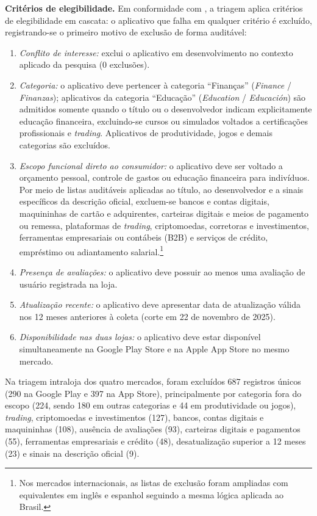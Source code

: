 \textbf{Critérios de elegibilidade.} Em conformidade com \textcite{alsebayel2025}, a triagem aplica critérios de elegibilidade em cascata: o aplicativo que falha em qualquer critério é excluído, registrando-se o primeiro motivo de exclusão de forma auditável:
\begin{enumerate}
    \item[(1)] \textit{Conflito de interesse:} exclui o aplicativo em desenvolvimento no contexto aplicado da pesquisa (0 exclusões).
    \item[(2)] \textit{Categoria:} o aplicativo deve pertencer à categoria ``Finanças'' (\textit{Finance} / \textit{Finanzas}); aplicativos da categoria ``Educação'' (\textit{Education} / \textit{Educación}) são admitidos somente quando o título ou o desenvolvedor indicam explicitamente educação financeira, excluindo-se cursos ou simulados voltados a certificações profissionais e \textit{trading}. Aplicativos de produtividade, jogos e demais categorias são excluídos.
    \item[(3)] \textit{Escopo funcional direto ao consumidor:} o aplicativo deve ser voltado a orçamento pessoal, controle de gastos ou educação financeira para indivíduos. Por meio de listas auditáveis aplicadas ao título, ao desenvolvedor e a sinais específicos da descrição oficial, excluem-se bancos e contas digitais, maquininhas de cartão e adquirentes, carteiras digitais e meios de pagamento ou remessa, plataformas de \textit{trading}, criptomoedas, corretoras e investimentos, ferramentas empresariais ou contábeis (B2B) e serviços de crédito, empréstimo ou adiantamento salarial.\footnote{Nos mercados internacionais, as listas de exclusão foram ampliadas com equivalentes em inglês e espanhol seguindo a mesma lógica aplicada ao Brasil.}
    \item[(4)] \textit{Presença de avaliações:} o aplicativo deve possuir ao menos uma avaliação de usuário registrada na loja.
    \item[(5)] \textit{Atualização recente:} o aplicativo deve apresentar data de atualização válida nos 12 meses anteriores à coleta (corte em 22 de novembro de 2025).
    \item[(6)] \textit{Disponibilidade nas duas lojas:} o aplicativo deve estar disponível simultaneamente na Google Play Store e na Apple App Store no mesmo mercado.
\end{enumerate}

Na triagem intraloja dos quatro mercados, foram excluídos 687 registros únicos (290 na Google Play e 397 na App Store), principalmente por categoria fora do escopo (224, sendo 180 em outras categorias e 44 em produtividade ou jogos), \textit{trading}, criptomoedas e investimentos (127), bancos, contas digitais e maquininhas (108), ausência de avaliações (93), carteiras digitais e pagamentos (55), ferramentas empresariais e crédito (48), desatualização superior a 12 meses (23) e sinais na descrição oficial (9).


